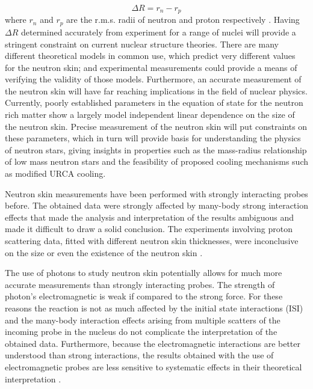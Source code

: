 \begin{equation}
\Delta R = r_{n} - r_{p}
\end{equation}
where $r_{n}$ and $r_{p}$ are the r.m.s. radii of neutron and proton respectively \cite{roca}. Having $\Delta R$ determined accurately from experiment for a range of nuclei will provide a stringent constraint on current nuclear structure theories. There are many different theoretical models in common use, which predict very different values for the neutron skin; and experimental measurements could provide a means of verifying the validity of those models. Furthermore, an accurate measurement of the neutron skin will have far reaching implications in the field of nuclear physics. Currently, poorly established parameters in the equation of state for the neutron rich matter show a largely model independent linear dependence on the size of the neutron skin. Precise measurement of the neutron skin will put constraints on these parameters, which in turn will provide basis for understanding the physics of neutron stars, giving insights in properties such as the mass-radius relationship of low mass neutron stars and the feasibility of proposed cooling mechanisms such as modified URCA cooling.

\indent Neutron skin measurements have been performed with strongly interacting probes before. The obtained data were strongly affected by many-body strong interaction effects that made the analysis and interpretation of the results ambiguous and made it difficult to draw a solid conclusion. The experiments involving proton scattering data, fitted with different neutron skin thicknesses, were inconclusive on the size or even the existence of the neutron skin \cite{piek}.

\indent The use of photons to study neutron skin potentially allows for much more accurate measurements than strongly interacting probes. The strength of photon's electromagnetic is weak if compared to the strong force. For these reasons the reaction is not as much affected by the initial state interactions (ISI) and the many-body interaction effects arising from multiple scatters of the incoming probe in the nucleus do not complicate the interpretation of the obtained data. Furthermore, because the electromagnetic interactions are better understood than strong interactions, the results obtained with the use of electromagnetic probes are less sensitive to systematic effects in their theoretical interpretation \cite{claire}.

